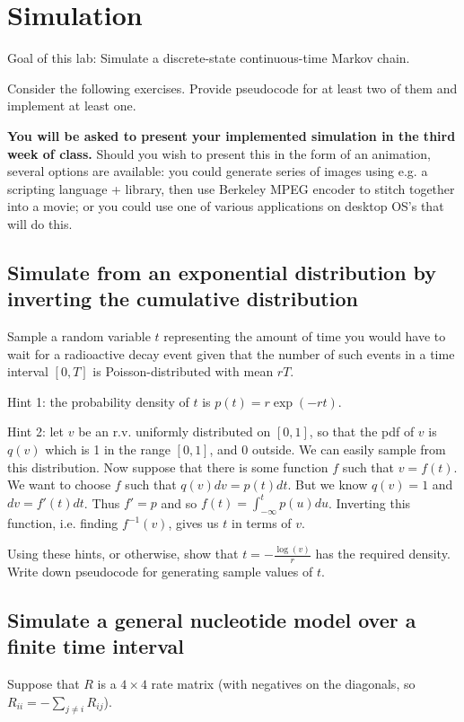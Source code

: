 \chapter{Simulation}

Goal of this lab:
Simulate a discrete-state continuous-time Markov chain.

Consider the following exercises.
Provide pseudocode for at least two of them and implement at least one.

{\bf You will be asked to present your implemented simulation in the third week of class.}
Should you wish to present this in the form of an animation, several options are available:
you could generate series of images using e.g. a scripting language + library,
then use Berkeley MPEG encoder to stitch together into a movie;
or you could use one of various applications on desktop OS's that will do this.

\section{Simulate from an exponential distribution by inverting the cumulative distribution}

Sample a random variable $t$ representing the amount of time you would have to wait for a radioactive decay event
given that the number of such events in a time interval $[0,T]$ is Poisson-distributed with mean $rT$.

Hint 1: the probability density of $t$ is $p(t) = r \exp(-r t)$.

Hint 2: let $v$ be an r.v. uniformly distributed on $[0,1]$,
so that the pdf of $v$ is $q(v)$ which is 1 in the range $[0,1]$, and 0 outside.
We can easily sample from this distribution.
Now suppose that there is some function $f$ such that $v = f(t)$.
We want to choose $f$ such that $q(v)dv = p(t)dt$.
But we know $q(v)=1$ and $dv = f'(t) dt$.
Thus $f'=p$ and so $f(t) = \int_{-\infty}^t p(u) du$.
Inverting this function, i.e. finding $f^{-1}(v)$, gives us $t$ in terms of $v$.

Using these hints, or otherwise, show that $t=-\frac{\log(v)}{r}$ has the required density.
Write down pseudocode for generating sample values of $t$.

\section{Simulate a general nucleotide model over a finite time interval}

Suppose that $R$ is a $4 \times 4$ rate matrix
(with negatives on the diagonals, so $R_{ii} = -\sum_{j \neq i} R_{ij}$).


